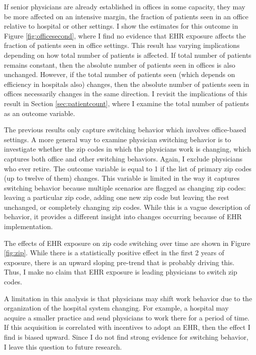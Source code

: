 \documentclass[11pt]{article}
\begin{document}
If senior physicians are already established in offices in some capacity, they may be more affected on an intensive margin, the fraction of patients seen in an office relative to hospital or other settings. I show the estimates for this outcome in Figure \ref{fig:officesecond}, where I find no evidence that EHR exposure affects the fraction of patients seen in office settings. This result has varying implications depending on how total number of patients is affected. If total number of patients remains constant, then the absolute number of patients seen in offices is also unchanged. However, if the total number of patients seen (which depends on efficiency in hospitals also) changes, then the absolute number of patients seen in offices necessarily changes in the same direction. I revisit the implications of this result in Section \ref{sec:patientcount}, where I examine the total number of patients as an outcome variable.

The previous results only capture switching behavior which involves office-based settings. A more general way to examine physician switching behavior is to investigate whether the zip codes in which the physicians work is changing, which captures both office and other switching behaviors. Again, I exclude physicians who ever retire. The outcome variable is equal to 1 if the list of primary zip codes (up to twelve of them) changes. This variable is limited in the way it captures switching behavior because multiple scenarios are flagged as changing zip codes: leaving a particular zip code, adding one new zip code but leaving the rest unchanged, or completely changing zip codes. While this is a vague description of behavior, it provides a different insight into changes occurring because of EHR implementation.

The effects of EHR exposure on zip code switching over time are shown in Figure \ref{fig:zip}. While there is a statistically positive effect in the first 2 years of exposure, there is an upward sloping pre-trend that is probably driving this. Thus, I make no claim that EHR exposure is leading physicians to switch zip codes.

A limitation in this analysis is that physicians may shift work behavior due to the organization of the hospital system changing. For example, a hospital may acquire a smaller practice and send physicians to work there for a period of time. If this acquisition is correlated with incentives to adopt an EHR, then the effect I find is biased upward. Since I do not find strong evidence for switching behavior, I leave this question to future research.
\end{document}

